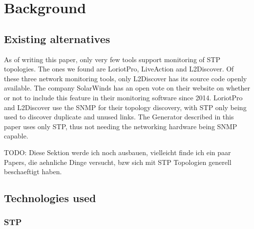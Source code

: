 \chapter{Background}
\section{Existing alternatives}
As of writing this paper, only very few tools support monitoring of STP topologies.
The ones we found are LoriotPro\cite{LoriotPro}, LiveAction\cite{LiveAction} and L2Discover\cite{L2Discover}.
Of these three network monitoring tools, only L2Discover has its source code openly available.
The company SolarWinds has an open vote on their website on whether or not to include this feature in their monitoring software since 2014\cite{thwackSW}.
LoriotPro and L2Discover use the SNMP for their topology discovery, with STP only being used to discover duplicate and unused links.
The Generator described in this paper uses only STP, thus not needing the networking hardware being SNMP capable.

TODO: Diese Sektion werde ich noch ausbauen, vielleicht finde ich ein paar Papers, die aehnliche Dinge versucht, bzw sich mit STP Topologien generell beschaeftigt haben.

\section{Technologies used}
\subsection{STP}
